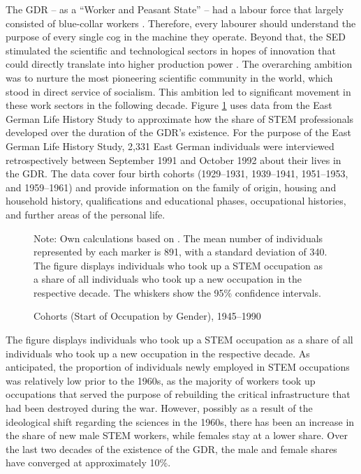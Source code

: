 \documentclass[a4paper, oneside, hyperfootnotes = false]{article}
\begin{document}
{%
The GDR -- as a ``Worker and Peasant State'' -- had a labour force that largely consisted of blue-collar workers \citep{DDRJahrbuch1957}.
Therefore, every labourer should understand the purpose of every single cog in the machine they operate.
Beyond that, the SED stimulated the scientific and technological sectors in hopes of innovation that could directly translate into higher production power \citep{Hoegselius2009}.
The overarching ambition was to nurture the most pioneering scientific community in the world, which stood in direct service of socialism.
This ambition led to significant movement in these work sectors in the following decade.
Figure \ref{fig:mayer} uses data from the East German Life History Study to approximate how the share of STEM professionals developed over the duration of the GDR's existence.
For the purpose of the East German Life History Study, 2,331 East German individuals were interviewed retrospectively between September 1991 and October 1992 about their lives in the GDR.
The data cover four birth cohorts (1929--1931, 1939--1941, 1951--1953, and 1959--1961) and provide information on the family of origin, housing and household history, qualifications and educational phases, occupational histories, and further areas of the personal life.

\begin{figure}[ht]
	\centering
	\caption{Cohorts (Start of Occupation by Gender), 1945--1990}
	\label{fig:mayer}
	\fontsize{9pt}{11pt}\selectfont
	\def\svgwidth{.9\textwidth}
	
	\vspace{2mm}
	\parbox{10cm}{
		\linespread{1}\footnotesize Note: Own calculations based on \cite{Mayer1995}. The mean number of individuals represented by each marker is 891, with a standard deviation of 340. The figure displays individuals who took up a STEM occupation as a share of all individuals who took up a new occupation in the respective decade. The whiskers show the 95\% confidence intervals.}
\end{figure}

The figure displays individuals who took up a STEM occupation as a share of all individuals who took up a new occupation in the respective decade.
As anticipated, the proportion of individuals newly employed in STEM occupations was relatively low prior to the 1960s, as the majority of workers took up occupations that served the purpose of rebuilding the critical infrastructure that had been destroyed during the war.
However, possibly as a result of the ideological shift regarding the sciences in the 1960s, there has been an increase in the share of new male STEM workers, while females stay at a lower share.
Over the last two decades of the existence of the GDR, the male and female shares have converged at approximately 10\%.

}
\end{document}
